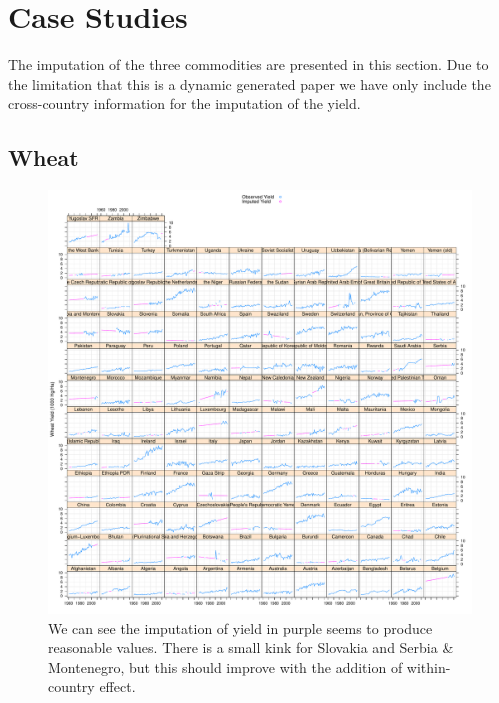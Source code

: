 \documentclass[nojss]{jss}\usepackage[]{graphicx}\usepackage[]{color}
\makeatletter
\def\maxwidth{ %
  \ifdim\Gin@nat@width>\linewidth
    \linewidth
  \else
    \Gin@nat@width
  \fi
}
\newenvironment{knitrout}{}{} %
\makeatother
\begin{document}
\section{Case Studies}

The imputation of the three commodities are presented in this
section. Due to the limitation that this is a dynamic generated paper
we have only include the cross-country information for the imputation
of the yield.


\subsection{Wheat}

\begin{knitrout}
\color{fgcolor}\begin{figure}[!ht]


{\centering \includegraphics[width=\maxwidth]{figure/wheat-yield-imputed} 

}

\caption[We can see the imputation of yield in purple seems to produce reasonable values]{We can see the imputation of yield in purple seems to produce reasonable values. There is a small kink for Slovakia and Serbia \& Montenegro, but this should improve with the addition of within-country effect.\label{fig:wheat-yield-imputed}}
\end{figure}


\end{knitrout}
\end{document}
